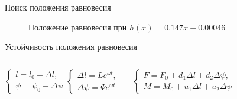 \documentclass[ignoreonframetext,unicode]{beamer}
\begin{document}
\begin{frame}{Поиск положения равновесия}
\vspace*{-1mm}
\begin{figure}[!htbp]
	\caption{Положение равновесия при $h(x) = 0.147 x + 0.00046$}
	\label{res_chasdasdaeck_func_2}
\end{figure}



\end{frame}

\begin{frame}{Устойчивость положения равновесия}
	\vspace*{-2mm}
	\begin{columns}
		
	\begin{block}{}
		\vspace*{2mm}
		\begin{equation*}
			\begin{cases}
				l = l_0 + \Delta{l}, \\
				\psi = \psi_0 + \Delta{\psi}
			\end{cases}
			\begin{cases}
			\Delta{l} = L e^{\omega t}, \\
			\Delta{\psi} = \Psi e^{\omega t}
			\end{cases}
			\label{kjdkjsnadkjadsbafabjb}
		\end{equation*}
	\end{block}

	\begin{block}{}
		\vspace*{2mm}
		\begin{equation*}
			\begin{cases}
			F = F_0 + d_1 \Delta{l} + d_2 \Delta{\psi}, \\
			M = M_0 + u_1 \Delta{l} + u_2 \Delta{\psi}
			\end{cases}
			\label{kjdkjsasdsanadkjadsbafabjb}
		\end{equation*}
	\end{block}
	
	\end{columns}


\end{frame}
\end{document}
